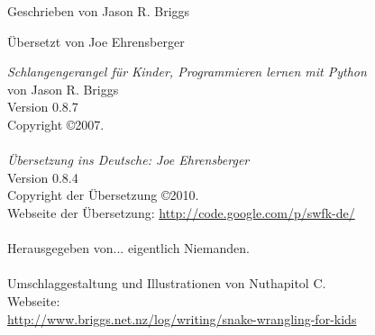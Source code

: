 \begin{flushright}
\textcolor{bleu}{\begin{Huge}\textsf{Geschrieben von Jason R. Briggs}\end{Huge}}

\textcolor{bleu}{\begin{huge}\textsf{Übersetzt von Joe Ehrensberger}\end{huge}}
\end{flushright}

\newpage






\newpage
\noindent
\textsf{\emph{Schlangengerangel für Kinder, Programmieren lernen mit Python}}\\
von Jason R. Briggs\\
Version 0.8.7
\\
Copyright \copyright 2007.\\
\\
\textsf{\emph{Übersetzung ins Deutsche: Joe Ehrensberger}}\\
Version 0.8.4\\
Copyright der Übersetzung \copyright 2010.\\
Webseite der Übersetzung: \href{http://code.google.com/p/swfk-de/}{http://code.google.com/p/swfk-de/}\\
\\
Herausgegeben von... eigentlich Niemanden.\\
\\
Umschlaggestaltung und Illustrationen von Nuthapitol C.\\
\linebreak 
\noindent
Webseite:\\ \href{http://www.briggs.net.nz/log/writing/snake-wrangling-for-kids}{http://www.briggs.net.nz/log/writing/snake-wrangling-for-kids}\\ 

